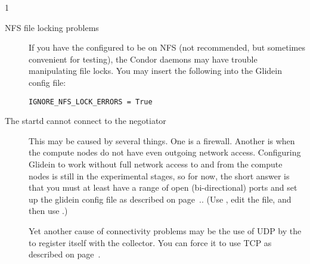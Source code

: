 \begin{ManPage}{\label{man-condor-glidein}}{1}
\begin{description}
\item[NFS file locking problems]  If you have the 
configured to be on NFS (not recommended, but sometimes convenient
for testing), the Condor daemons may have trouble manipulating file
locks.  You may insert the following into the Glidein config file:

\begin{verbatim}
IGNORE_NFS_LOCK_ERRORS = True
\end{verbatim}

\item[The startd cannot connect to the negotiator] This may be caused
by several things.  One is a firewall.  Another is when the compute
nodes do not have even outgoing network access.  Configuring Glidein
to work without full network access to and from the compute nodes is
still in the experimental stages, so for now, the short answer is that
you must at least have a range of open (bi-directional) ports and set
up the glidein config file as described on
page~\pageref{param:HighPort}..  (Use , edit the file,
and then use .)

Yet another cause of connectivity problems may be the use of UDP by
the  to register itself with the collector.  You can
force it to use TCP as described on
page~\pageref{param:UpdateCollectorWithTcp}.

\end{description}

\end{ManPage}
